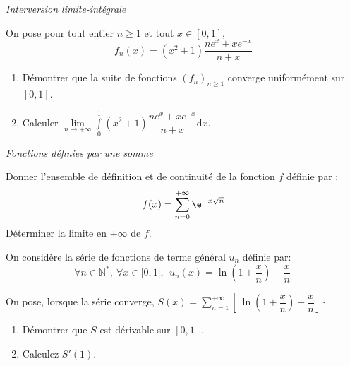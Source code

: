 \documentclass[a4paper,10pt]{report}
\begin{document}
\medskip

\begin{center}
\textit{{ {\large Interversion limite-intégrale}}}
\end{center}

\medskip


\begin{Exa}On pose pour tout entier $n \geq 1$ et tout $x \in [0,1]$,
$$f_{n}\left( x\right) =\left( x^{2}+1\right) \dfrac{ne^{x}+xe^{-x}}{n+x} $$

\begin{enumerate}
\item Démontrer que la suite de fonctions $\left( f_{n}\right) _{n \geq 1}$ converge uniform\'{e}ment sur $[0,1]$.
\item Calculer $\underset{n\rightarrow +\infty }{\lim }\displaystyle\int\limits_{0}^{1}\left( x^{2}+1\right) \dfrac{ne^{x}+xe^{-x}}{n+x}\text{d}x$.
\end{enumerate}
\end{Exa} 


\medskip

\begin{center}
\textit{{ {\large Fonctions définies par une somme}}}
\end{center}

\medskip


\begin{Exa} Donner l'ensemble de définition et de continuité de la fonction $f$ définie par :
  \[
  f(x) = \sum_{n = 0}^{ + \infty} \e^{ - x\sqrt n}
  \]
 Déterminer la limite en $ + \infty$ de $f$.
 \end{Exa}
 

\begin{Exa} On consid\`{e}re la s\'{e}rie de fonctions de terme g\'{e}n\'{e}ral $u_{n}$ d\'{e}finie par: 
\begin{equation*}
\forall n\in \mathbb{N}^{*},\ \forall x\in \lbrack 0,1], \ \ u_{n}\left(x\right) =\ln \left( 1+\dfrac{x}{n}\right) -\dfrac{x}{n}~
\end{equation*}

On pose, lorsque la s\'{e}rie converge, $S(x)=\displaystyle\sum\limits_{n=1}^{+\infty }\left[ \ \ln \left( 1+\dfrac{x}{n}\right) -\dfrac{x}{n}\right] \cdot$

\begin{enumerate}
\item D\'{e}montrer que $S$ est dérivable sur $[0,1]$.
\item Calculez $S'(1)$.
\end{enumerate}
\end{Exa}
\end{document}
